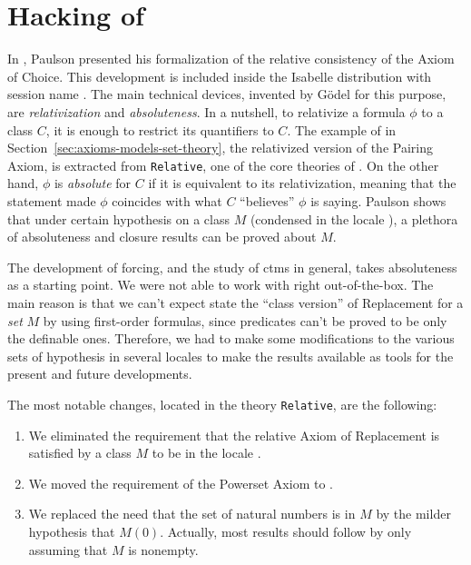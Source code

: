 \section{Hacking of }

In \cite{paulson_2003}, Paulson presented his formalization of the
relative consistency of the Axiom of Choice. This development is
included inside the Isabelle distribution with session name
. The main technical devices, invented by
G\"odel for this purpose, are \emph{relativization} and
\emph{absoluteness}. In a nutshell, to relativize a formula $\phi$ to
a class $C$, it is enough to restrict its quantifiers to $C$. The
example of  in
Section~\ref{sec:axioms-models-set-theory}, the relativized version of
the Pairing Axiom, is extracted from \texttt{Relative}, one of the
core theories of . On the other hand, $\phi$
is \emph{absolute} for $C$ if it is equivalent to its relativization,
meaning that the statement made $\phi$ coincides with what $C$
``believes'' $\phi$ is saying. Paulson shows that under certain
hypothesis  on a class $M$ (condensed in the locale ), a plethora of
absoluteness and closure results can be proved about $M$.

The development of forcing, and the study of ctms in general, takes
absoluteness as a starting point. We were not able to work with
 right out-of-the-box. The main reason is that
we can't expect state the ``class version'' of Replacement for a
\emph{set} $M$ by
using first-order formulas, since predicates  can't
be proved to be only the definable ones. Therefore, we had to make
some modifications to the various sets of hypothesis in several
locales to make the results available as tools for the present and
future developments.


The most notable changes, located in the theory \texttt{Relative}, are
the following:
\begin{enumerate}
\item\label{item:1} We eliminated the requirement that the relative Axiom of Replacement
  is satisfied by a class $M$ to be in the locale . 
\item\label{item:2} We moved the requirement of the Powerset Axiom to . 
\item\label{item:3} We replaced the need that the set of natural numbers is in $M$ by the
  milder hypothesis that $M(0)$. Actually, most results should follow
  by only assuming that $M$ is nonempty.
\end{enumerate}

